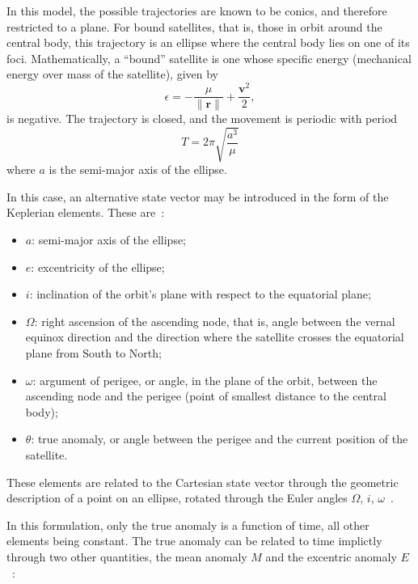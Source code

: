 In this model, the possible trajectories are known to be conics, and therefore restricted to a plane. For bound satellites, that is, those in orbit around the central body, this trajectory is an ellipse where the central body lies on one of its foci. Mathematically, a ``bound'' satellite is one whose specific energy (mechanical energy over mass of the satellite), given by~\cite{curtis2015orbital}
\begin{equation}
    \epsilon = -\frac{\mu}{\lVert \mathbf{r} \rVert} + \frac{\mathbf{v}^2}{2},
\end{equation}
is negative. The trajectory is closed, and the movement is periodic with period~\cite{curtis2015orbital}
\begin{equation}
    T = 2\pi \sqrt{\frac{a^3}{\mu}}
\end{equation}
where \(a\) is the semi-major axis of the ellipse.

In this case, an alternative state vector may be introduced in the form of the Keplerian elements. These are~\cite{curtis2015orbital}:
\begin{itemize}
    \item \(a\): semi-major axis of the ellipse;
    \item \(e\): excentricity of the ellipse;
    \item \(i\): inclination of the orbit's plane with respect to the equatorial plane;
    \item \(\Omega \): right ascension of the ascending node, that is, angle between the vernal equinox direction and the direction where the satellite crosses the equatorial plane from South to North;
    \item \(\omega \): argument of perigee, or angle, in the plane of the orbit, between the ascending node and the perigee (point of smallest distance to the central body);
    \item \(\theta \): true anomaly, or angle between the perigee and the current position of the satellite.
\end{itemize}

These elements are related to the Cartesian state vector through the geometric description of a point on an ellipse, rotated through the Euler angles \(\Omega\), \(i\), \(\omega\)~\cite{curtis2015orbital}.


In this formulation, only the true anomaly is a function of time, all other elements being constant. The true anomaly can be related to time implictly through two other quantities, the mean anomaly \(M\) and the excentric anomaly \(E\)~\cite{curtis2015orbital}:

